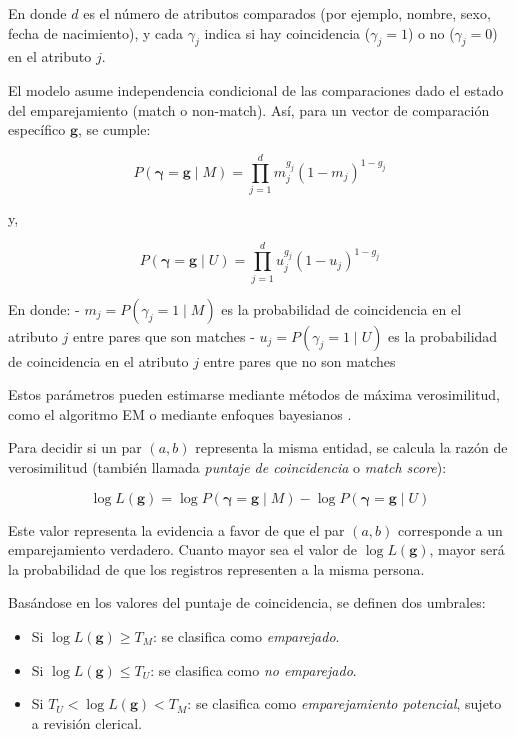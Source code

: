 \documentclass[
  12pt,
]{book}
\providecommand{\tightlist}{%
  \setlength{\itemsep}{0pt}\setlength{\parskip}{0pt}}
\begin{document}
En donde \(d\) es el número de atributos comparados (por ejemplo, nombre, sexo, fecha de nacimiento), y cada \(\gamma_j\) indica si hay coincidencia (\(\gamma_j = 1\)) o no (\(\gamma_j = 0\)) en el atributo \(j\).

El modelo asume independencia condicional de las comparaciones dado el estado del emparejamiento (match o non-match). Así, para un vector de comparación específico \(\boldsymbol{g}\), se cumple:

\[P(\boldsymbol{\gamma} = \boldsymbol{g} \mid M) = \prod_{j=1}^d m_j^{g_j} (1 - m_j)^{1 - g_j}\]

y,

\[P(\boldsymbol{\gamma} = \boldsymbol{g} \mid U) = \prod_{j=1}^d u_j^{g_j} (1 - u_j)^{1 - g_j}\]

En donde:
- \(m_j = P(\gamma_j = 1 \mid M)\) es la probabilidad de coincidencia en el atributo \(j\) entre pares que son matches
- \(u_j = P(\gamma_j = 1 \mid U)\) es la probabilidad de coincidencia en el atributo \(j\) entre pares que no son matches

Estos parámetros pueden estimarse mediante métodos de máxima verosimilitud, como el algoritmo EM o mediante enfoques bayesianos \citep{winkler2000using, larsen2001iterative}.

Para decidir si un par \((a, b)\) representa la misma entidad, se calcula la razón de verosimilitud (también llamada \emph{puntaje de coincidencia} o \emph{match score}):

\[\log L(\boldsymbol{g}) = \log P(\boldsymbol{\gamma} = \boldsymbol{g} \mid M) - \log P(\boldsymbol{\gamma} = \boldsymbol{g} \mid U)\]

Este valor representa la evidencia a favor de que el par \((a, b)\) corresponde a un emparejamiento verdadero. Cuanto mayor sea el valor de \(\log L(\boldsymbol{g})\), mayor será la probabilidad de que los registros representen a la misma persona.

Basándose en los valores del puntaje de coincidencia, se definen dos umbrales:

\begin{itemize}
\tightlist
\item
  Si \(\log L(\boldsymbol{g}) \geq T_M\): se clasifica como \emph{emparejado}.
\item
  Si \(\log L(\boldsymbol{g}) \leq T_U\): se clasifica como \emph{no emparejado}.
\item
  Si \(T_U < \log L(\boldsymbol{g}) < T_M\): se clasifica como \emph{emparejamiento potencial}, sujeto a revisión clerical.
\end{itemize}
\end{document}
